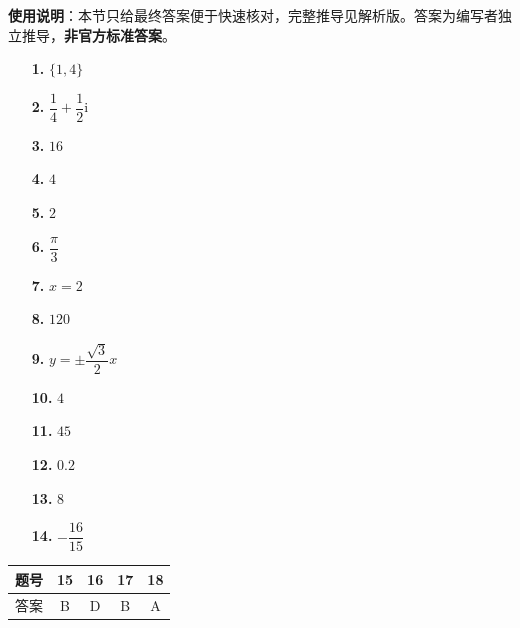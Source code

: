 
\begin{gknotice}
\textbf{使用说明}：本节只给最终答案便于快速核对，完整推导见解析版。答案为编写者独立推导，\textbf{非官方标准答案}。
\end{gknotice}

\begin{itemize}[leftmargin=2.6em]
  \item[\textbf{1.}] \(\{1,4\}\)
  \item[\textbf{2.}] \(\dfrac{1}{4}+\dfrac{1}{2}\mathrm{i}\)
  \item[\textbf{3.}] \(16\)
  \item[\textbf{4.}] \(4\)
  \item[\textbf{5.}] \(2\)
  \item[\textbf{6.}] \(\dfrac{\pi}{3}\)
  \item[\textbf{7.}] \(x=2\)
  \item[\textbf{8.}] \(120\)
  \item[\textbf{9.}] \(y=\pm\dfrac{\sqrt{3}}{2}x\)
  \item[\textbf{10.}] \(4\)
  \item[\textbf{11.}] \(45\)
  \item[\textbf{12.}] \(0.2\)
  \item[\textbf{13.}] \(8\)
  \item[\textbf{14.}] \(-\dfrac{16}{15}\)
\end{itemize}

\begin{center}\begin{tabular}{ccccc}
\toprule
题号 & 15 & 16 & 17 & 18 \\
\midrule
答案 & B & D & B & A \\
\bottomrule
\end{tabular}\end{center}

